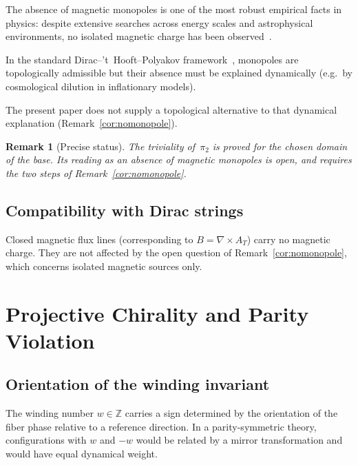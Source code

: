 \documentclass[11pt,a4paper]{article}
\newtheorem{remark}[theorem]{Remark}
\begin{document}
      The absence of magnetic monopoles is one of the most robust empirical
      facts in physics: despite extensive searches across energy scales
      and astrophysical environments, no isolated magnetic charge has been
      observed~\cite{PDG,Patrizii2015}.

      In the standard Dirac--'t~Hooft--Polyakov
      framework~\cite{Dirac1931,tHooft1974,Polyakov1974},
      monopoles are topologically admissible but their absence must be
      explained dynamically (e.g.\ by cosmological dilution in inflationary
      models).

      The present paper does not supply a topological alternative to that
      dynamical explanation (Remark~\ref{cor:nomonopole}).

      \begin{remark}[Precise status]
        \label{rem:monopolestatus}
        The triviality of~$\pi_2$ is proved for the chosen domain of the base.
        Its reading as an absence of magnetic monopoles is open, and requires
        the two steps of Remark~\ref{cor:nomonopole}.
      \end{remark}

    \subsection{Compatibility with Dirac strings}

      Closed magnetic flux lines (corresponding to $B = \nabla \times A_T$)
      carry no magnetic charge.
      They are not affected by the open question of
      Remark~\ref{cor:nomonopole}, which concerns isolated magnetic sources
      only.

  \section{Projective Chirality and Parity Violation}
    \label{sec:chirality}

    \subsection{Orientation of the winding invariant}

      The winding number $w \in \mathbb{Z}$ carries a sign determined by the
      orientation of the fiber phase relative to a reference direction.
      In a parity-symmetric theory, configurations with $w$ and $-w$ would
      be related by a mirror transformation and would have equal dynamical
      weight.
\end{document}
